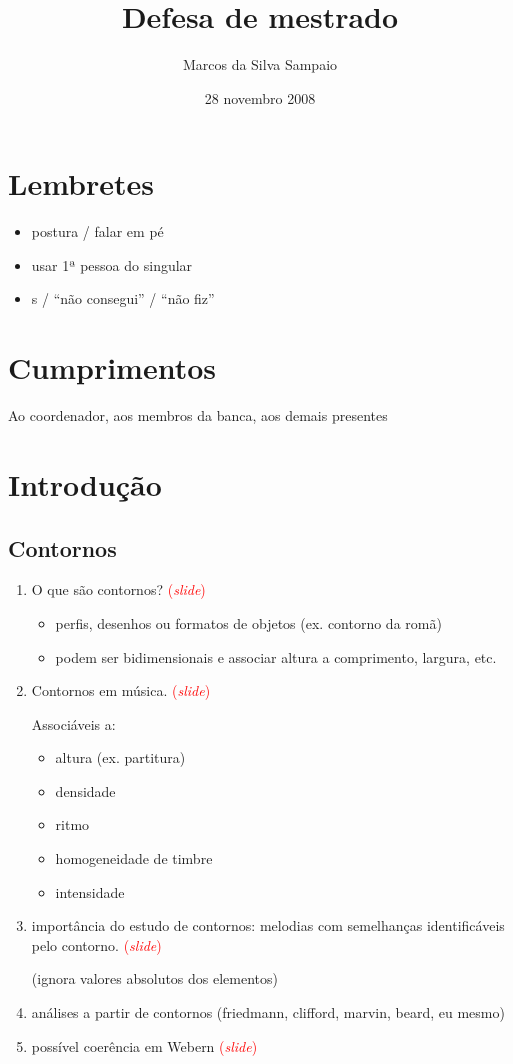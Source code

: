 \documentclass[12pt,a4paper]{article}
\title{Defesa de mestrado}
\author{Marcos da Silva Sampaio}
\date{28 novembro 2008}
\newcommand{\slide}{\textcolor{red}{(\textit{slide})}}
\begin{document}
\maketitle
\thispagestyle{empty}

\section*{Lembretes}

\begin{itemize}
\item postura / falar em pé
\item usar 1ª pessoa do singular
\item s / ``não consegui'' / ``não fiz''
\end{itemize}

\section*{Cumprimentos}

Ao coordenador, aos membros da banca, aos demais presentes

\section{Introdução}

\subsection{Contornos}

\begin{enumerate}
\item O que são contornos? \slide{}
  \begin{itemize}
  \item perfis, desenhos ou formatos de objetos (ex. contorno da romã)
  \item podem ser bidimensionais e associar altura a comprimento,
    largura, etc.
  \end{itemize}
\item Contornos em música. \slide{}

  Associáveis a:
  \begin{itemize}
  \item altura (ex. partitura)
  \item densidade
  \item ritmo
  \item homogeneidade de timbre
  \item intensidade
  \end{itemize}
\item importância do estudo de contornos: melodias com semelhanças
  identificáveis pelo contorno. \slide{}

  (ignora valores absolutos dos elementos)
\item análises a partir de contornos (friedmann, clifford, marvin, beard, eu mesmo)
\item possível coerência em Webern \slide{}
\end{enumerate}
\end{document}
